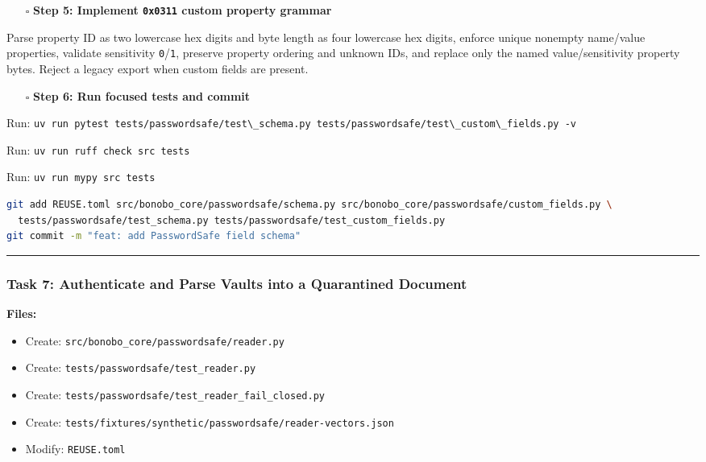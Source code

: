 \documentclass[
  letterpaper,
]{article}
\newcommand{\passthrough}[1]{#1}
\providecommand{\tightlist}{%
  \setlength{\itemsep}{0pt}\setlength{\parskip}{0pt}}
\begin{document}
\begin{itemize}
\tightlist
\item[$\square$]
  \textbf{Step 5: Implement \passthrough{\lstinline!0x0311!} custom property grammar}
\end{itemize}

Parse property ID as two lowercase hex digits and byte length as four lowercase hex digits, enforce unique nonempty
name/value properties, validate sensitivity \passthrough{\lstinline!0!}/\passthrough{\lstinline!1!}, preserve property
ordering and unknown IDs, and replace only the named value/sensitivity property bytes. Reject a legacy export when
custom fields are present.

\begin{itemize}
\tightlist
\item[$\square$]
  \textbf{Step 6: Run focused tests and commit}
\end{itemize}

Run:
\passthrough{\lstinline!uv run pytest tests/passwordsafe/test\_schema.py tests/passwordsafe/test\_custom\_fields.py -v!}

Run: \passthrough{\lstinline!uv run ruff check src tests!}

Run: \passthrough{\lstinline!uv run mypy src tests!}

\begin{lstlisting}[language=bash]
git add REUSE.toml src/bonobo_core/passwordsafe/schema.py src/bonobo_core/passwordsafe/custom_fields.py \
  tests/passwordsafe/test_schema.py tests/passwordsafe/test_custom_fields.py
git commit -m "feat: add PasswordSafe field schema"
\end{lstlisting}

\begin{center}\rule{0.5\linewidth}{0.5pt}\end{center}

\subsubsection{Task 7: Authenticate and Parse Vaults into a Quarantined
Document}\label{task-7-authenticate-and-parse-vaults-into-a-quarantined-document}

\textbf{Files:}

\begin{itemize}
\tightlist
\item
  Create: \nolinkurl{src/bonobo_core/passwordsafe/reader.py}
\item
  Create: \nolinkurl{tests/passwordsafe/test_reader.py}
\item
  Create: \nolinkurl{tests/passwordsafe/test_reader_fail_closed.py}
\item
  Create: \nolinkurl{tests/fixtures/synthetic/passwordsafe/reader-vectors.json}
\item
  Modify: \nolinkurl{REUSE.toml}
\end{itemize}
\end{document}
